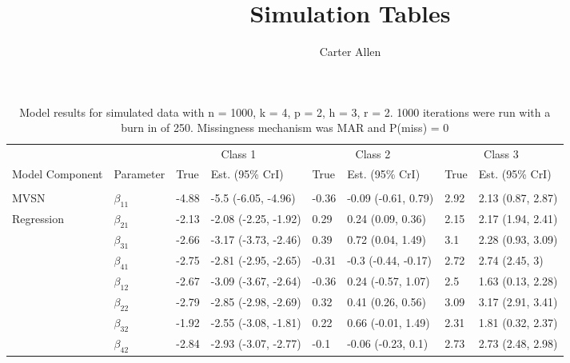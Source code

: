 \documentclass[]{article}
\title{Simulation Tables}
\author{Carter Allen}
\date{}
\begin{document}
\maketitle

\begin{table}[t]

\caption{\label{tab:unnamed-chunk-4}Model results for simulated data with n = 1000, k = 4, p = 2, h = 3, r = 2. 1000 iterations were run with a burn in of 250. Missingness mechanism was MAR and P(miss) = 0}
\centering
\fontsize{8}{10}\selectfont
\begin{tabular}{llllllll}
\toprule
\multicolumn{2}{c}{ } & \multicolumn{2}{c}{Class 1} & \multicolumn{2}{c}{Class 2} & \multicolumn{2}{c}{Class 3} \\
\cmidrule(l{3pt}r{3pt}){3-4} \cmidrule(l{3pt}r{3pt}){5-6} \cmidrule(l{3pt}r{3pt}){7-8}
Model Component & Parameter & True & Est. (95\% CrI) & True & Est. (95\% CrI) & True & Est. (95\% CrI)\\
\midrule
\addlinespace[0.3em]
\multicolumn{8}{l}{\textbf{ }}\\
\hspace{1em}MVSN & $\beta_{11}$ & -4.88 & -5.5 (-6.05, -4.96) & -0.36 & -0.09 (-0.61, 0.79) & 2.92 & 2.13 (0.87, 2.87)\\
\hspace{1em}Regression & $\beta_{21}$ & -2.13 & -2.08 (-2.25, -1.92) & 0.29 & 0.24 (0.09, 0.36) & 2.15 & 2.17 (1.94, 2.41)\\
\hspace{1em} & $\beta_{31}$ & -2.66 & -3.17 (-3.73, -2.46) & 0.39 & 0.72 (0.04, 1.49) & 3.1 & 2.28 (0.93, 3.09)\\
\hspace{1em} & $\beta_{41}$ & -2.75 & -2.81 (-2.95, -2.65) & -0.31 & -0.3 (-0.44, -0.17) & 2.72 & 2.74 (2.45, 3)\\
\hspace{1em} & $\beta_{12}$ & -2.67 & -3.09 (-3.67, -2.64) & -0.36 & 0.24 (-0.57, 1.07) & 2.5 & 1.63 (0.13, 2.28)\\
\hspace{1em} & $\beta_{22}$ & -2.79 & -2.85 (-2.98, -2.69) & 0.32 & 0.41 (0.26, 0.56) & 3.09 & 3.17 (2.91, 3.41)\\
\hspace{1em} & $\beta_{32}$ & -1.92 & -2.55 (-3.08, -1.81) & 0.22 & 0.66 (-0.01, 1.49) & 2.31 & 1.81 (0.32, 2.37)\\
\hspace{1em} & $\beta_{42}$ & -2.84 & -2.93 (-3.07, -2.77) & -0.1 & -0.06 (-0.23, 0.1) & 2.73 & 2.73 (2.48, 2.98)\\

\end{tabular}
\end{table}
\end{document}
